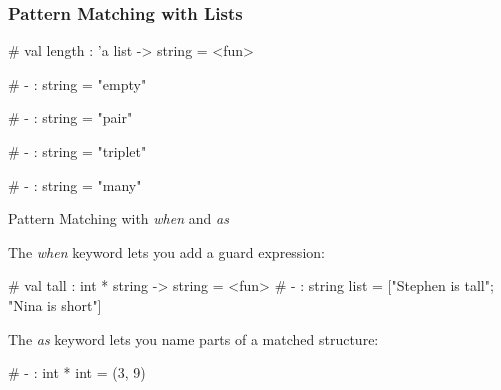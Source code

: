\documentclass{plt}
\begin{document}
\begin{frame}[fragile]
  \frametitle{Pattern Matching with Lists}

\begin{interactive}
# 
val length : 'a list -> string = <fun>

# 
- : string = "empty"

# 
- : string = "pair"

# 
- : string = "triplet"

# 
- : string = "many"
\end{interactive}

\end{frame}

\begin{frame}[fragile]{Pattern Matching with \emph{when} and \emph{as}}

The \emph{when} keyword lets you add a guard expression:

\begin{interactive}
#  
val tall : int * string -> string = <fun>
# 
- : string list = ["Stephen is tall"; "Nina is short"]
\end{interactive}

The \emph{as} keyword lets you name parts of a matched structure:

\begin{interactive}
# 
- : int * int = (3, 9)
\end{interactive}

\end{frame}
\end{document}
